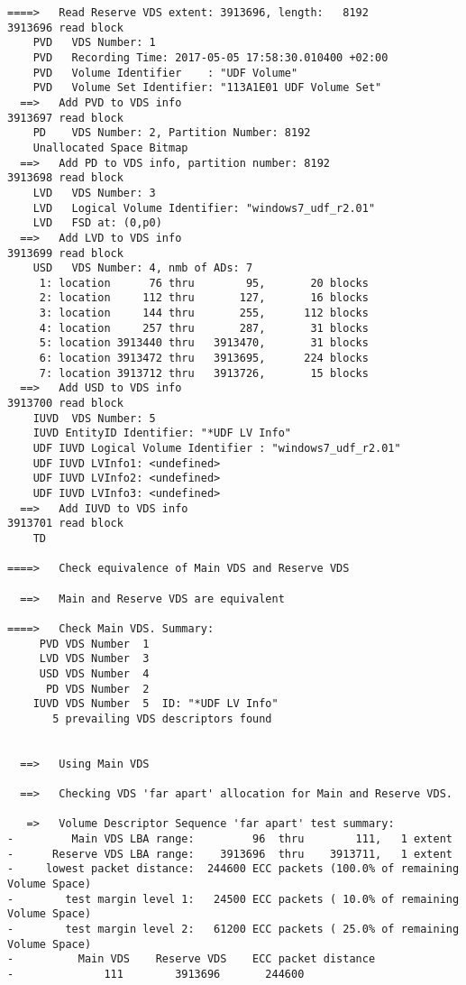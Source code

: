 \begin{lstlisting}
====>   Read Reserve VDS extent: 3913696, length:   8192
3913696 read block
    PVD   VDS Number: 1
    PVD   Recording Time: 2017-05-05 17:58:30.010400 +02:00
    PVD   Volume Identifier    : "UDF Volume"
    PVD   Volume Set Identifier: "113A1E01 UDF Volume Set"
  ==>   Add PVD to VDS info
3913697 read block
    PD    VDS Number: 2, Partition Number: 8192
    Unallocated Space Bitmap
  ==>   Add PD to VDS info, partition number: 8192
3913698 read block
    LVD   VDS Number: 3
    LVD   Logical Volume Identifier: "windows7_udf_r2.01"
    LVD   FSD at: (0,p0)
  ==>   Add LVD to VDS info
3913699 read block
    USD   VDS Number: 4, nmb of ADs: 7
     1: location      76 thru        95,       20 blocks
     2: location     112 thru       127,       16 blocks
     3: location     144 thru       255,      112 blocks
     4: location     257 thru       287,       31 blocks
     5: location 3913440 thru   3913470,       31 blocks
     6: location 3913472 thru   3913695,      224 blocks
     7: location 3913712 thru   3913726,       15 blocks
  ==>   Add USD to VDS info
3913700 read block
    IUVD  VDS Number: 5
    IUVD EntityID Identifier: "*UDF LV Info"
    UDF IUVD Logical Volume Identifier : "windows7_udf_r2.01"
    UDF IUVD LVInfo1: <undefined>
    UDF IUVD LVInfo2: <undefined>
    UDF IUVD LVInfo3: <undefined>
  ==>   Add IUVD to VDS info
3913701 read block
    TD  

====>   Check equivalence of Main VDS and Reserve VDS

  ==>   Main and Reserve VDS are equivalent

====>   Check Main VDS. Summary:
     PVD VDS Number  1
     LVD VDS Number  3
     USD VDS Number  4
      PD VDS Number  2
    IUVD VDS Number  5  ID: "*UDF LV Info"
       5 prevailing VDS descriptors found


  ==>   Using Main VDS

  ==>   Checking VDS 'far apart' allocation for Main and Reserve VDS.

   =>   Volume Descriptor Sequence 'far apart' test summary:
-         Main VDS LBA range:         96  thru        111,   1 extent
-      Reserve VDS LBA range:    3913696  thru    3913711,   1 extent
-     lowest packet distance:  244600 ECC packets (100.0% of remaining Volume Space)
-        test margin level 1:   24500 ECC packets ( 10.0% of remaining Volume Space)
-        test margin level 2:   61200 ECC packets ( 25.0% of remaining Volume Space)
-          Main VDS    Reserve VDS    ECC packet distance
-              111        3913696       244600                      



\end{lstlisting}
